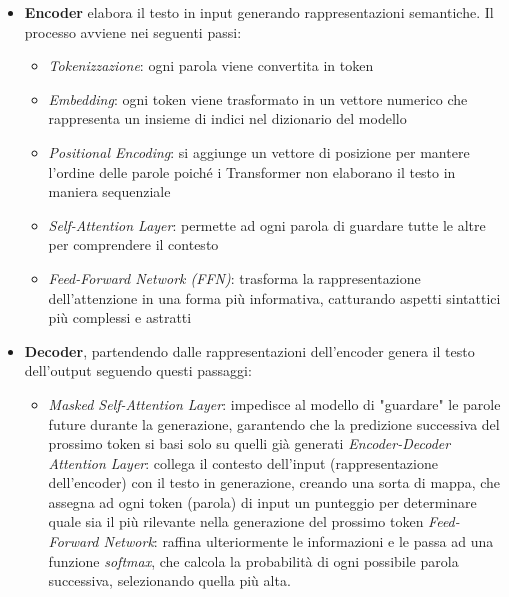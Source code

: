 \documentclass{article}
\begin{document}
\begin{itemize}
\item \textbf{Encoder} elabora il testo in input generando rappresentazioni semantiche. Il processo avviene nei seguenti passi:
\begin{itemize}
    \item \textit{Tokenizzazione}: ogni parola viene convertita in token
    \item \textit{Embedding}: ogni token viene trasformato in un vettore numerico che rappresenta un insieme di indici nel dizionario del modello
    \item \textit{Positional Encoding}: si aggiunge un vettore di posizione per mantere l'ordine delle parole poiché i Transformer non elaborano il testo in maniera sequenziale
    \item \textit{Self-Attention Layer}: permette ad ogni parola di guardare tutte le altre per comprendere il contesto
    \item \textit{Feed-Forward Network (FFN)}: trasforma la rappresentazione dell'attenzione in una forma più informativa, catturando aspetti sintattici più complessi e astratti
    
\end{itemize}

\item \textbf{Decoder}, partendendo dalle rappresentazioni dell'encoder genera il testo dell'output seguendo questi passaggi:
\begin{itemize}
    \item \textit{Masked Self-Attention Layer}: impedisce al modello di "guardare" le parole future durante la generazione, garantendo che la predizione successiva del prossimo token si basi solo su quelli già generati
    \textit{Encoder-Decoder Attention Layer}: collega il contesto dell’input (rappresentazione dell'encoder) con il testo in generazione, creando una sorta di mappa, che assegna ad ogni token (parola) di input un punteggio per determinare quale sia il più rilevante nella generazione del prossimo token
    \textit{Feed-Forward Network}: raffina ulteriormente le informazioni e le passa ad una funzione \textit{softmax}, che calcola la probabilità di ogni possibile parola successiva, selezionando quella più alta.
\end{itemize}


\end{itemize}
\end{document}
